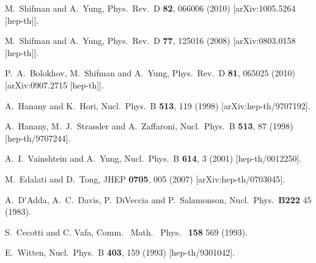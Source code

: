 \documentclass[12pt]{article}
\newcommand{\ntwo}{${\mathcal N}=2$}
\begin{document}
\begin{thebibliography}{99}
  
  M.~Shifman and A.~Yung,
  Phys.\ Rev.\ D {\bf 82}, 066006 (2010)
  [arXiv:1005.5264 [hep-th]].

  M.~Shifman and A.~Yung,
  Phys.\ Rev.\  D {\bf 77}, 125016 (2008)
  [arXiv:0803.0158 [hep-th]].

  P.~A.~Bolokhov, M.~Shifman and A.~Yung,
  Phys.\ Rev.\  D {\bf 81}, 065025 (2010)
  [arXiv:0907.2715 [hep-th]].
  
  
A.~Hanany and K.~Hori,
  Nucl.\ Phys.\  B {\bf 513}, 119 (1998)
  [arXiv:hep-th/9707192].
  
A.~Hanany, M.~J.~Strassler and A.~Zaffaroni,
Nucl.\ Phys.\ B {\bf 513}, 87 (1998)
[hep-th/9707244].

A.~I.~Vainshtein and A.~Yung,
Nucl.\ Phys.\ B {\bf 614}, 3 (2001)
[hep-th/0012250].

  
  M.~Edalati and D.~Tong,
  JHEP {\bf 0705}, 005 (2007)
  [arXiv:hep-th/0703045].
  
A.~D'Adda, A.~C.~Davis, P.~DiVeccia and P.~Salamonson,
Nucl.\ Phys.\ {\bf B222} 45 (1983).
   
S.~Cecotti and C. Vafa,
Comm. \ Math. \ Phys. \ {\bf 158} 569 (1993).

E.~Witten,
  Nucl.\ Phys.\ B {\bf 403}, 159 (1993)
  [hep-th/9301042].

  
\end{thebibliography}
\end{document}
